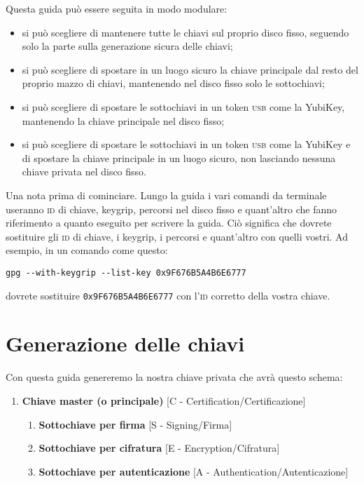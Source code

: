 \documentclass[a4paper,10pt]{article}
\begin{document}
Questa guida può essere seguita in modo modulare:

\begin{itemize}
 \item si può scegliere di mantenere tutte le chiavi sul proprio disco fisso, seguendo solo la parte sulla generazione sicura delle chiavi;
 \item si può scegliere di spostare in un luogo sicuro la chiave principale dal resto del proprio mazzo di chiavi, mantenendo nel disco fisso solo le sottochiavi;
 \item si può scegliere di spostare le sottochiavi in un token \textsc{usb} come la YubiKey, mantenendo la chiave principale nel disco fisso;
 \item si può scegliere di spostare le sottochiavi in un token \textsc{usb} come la YubiKey e di spostare la chiave principale in un luogo sicuro, non lasciando nessuna chiave privata nel disco fisso.
\end{itemize}

Una nota prima di cominciare. Lungo la guida i vari comandi da terminale useranno \textsc{id} di chiave, keygrip, percorsi nel disco fisso e quant'altro che fanno riferimento a quanto eseguito per scrivere la guida. Ciò significa che dovrete sostituire gli \textsc{id} di chiave, i keygrip, i percorsi e quant'altro con quelli vostri. Ad esempio, in un comando come questo:

\begin{verbatim}
gpg --with-keygrip --list-key 0x9F676B5A4B6E6777
\end{verbatim}

dovrete sostituire \texttt{0x9F676B5A4B6E6777} con l'\textsc{id} corretto della vostra chiave.

\section{Generazione delle chiavi}

Con questa guida genereremo la nostra chiave privata che avrà questo schema:

\begin{enumerate}
 \item \textbf{Chiave master (o principale)} [C - Certification/Certificazione]
 \begin{enumerate}
  \item \textbf{Sottochiave per firma} [S - Signing/Firma]
  \item \textbf{Sottochiave per cifratura} [E - Encryption/Cifratura]
  \item \textbf{Sottochiave per autenticazione} [A - Authentication/Autenticazione]
 \end{enumerate}
\end{enumerate}
\end{document}
